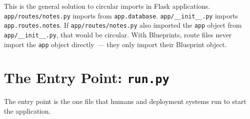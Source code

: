 This is the general solution to circular imports in Flask applications. \texttt{app/}\allowbreak{}\texttt{routes/}\allowbreak{}\texttt{notes.py} imports from \texttt{app.database}. \texttt{app/\_\_init\_\_.py} imports \texttt{app.routes.notes}. If \texttt{app/}\allowbreak{}\texttt{routes/}\allowbreak{}\texttt{notes.py} also imported the \texttt{app} object from \texttt{app/\_\_init\_\_.py}, that would be circular. With Blueprints, route files never import the \texttt{app} object directly~--- they only import their Blueprint object.

\setcounter{section}{5}
\section{\texorpdfstring{The Entry Point: \texttt{run.py}}{The Entry Point: run.py}}\label{15-structuring-the-application:156-the-entry-point-runpy}

The entry point is the one file that humans and deployment systems run to start the application.

